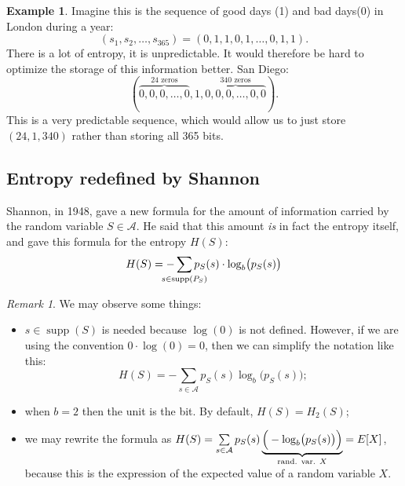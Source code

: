 \documentclass{report}
\DeclareMathOperator{\supp}{supp}
\theoremstyle{plain}
\theoremstyle{definition}
\newtheorem{exmp}[thm]{Example}
\theoremstyle{remark}
\newtheorem*{remark}{Remark}
\begin{document}
\begin{exmp} Imagine this is the sequence of good days (1) and bad days(0) in London during a year:
\begin{equation*}
	(s_1, s_2, \dots, s_{365}) = (0, 1, 1, 0, 1, \dots, 0, 1, 1).
\end{equation*}
 There is a lot of entropy, it is unpredictable. It would therefore be hard to optimize the storage of this information better.
San Diego:
\begin{equation*}
	(\overbrace{0, 0, 0, \dots, 0}^{\text{24 zeros}}, 1, \overbrace{0, 0, 0, \dots, 0, 0}^{\text{340 zeros}}).
\end{equation*}
 This is a very predictable sequence, which would allow us to just store $(24, 1, 340)$ rather than storing all 365 bits.
\end{exmp}

\subsection{Entropy redefined by Shannon}
Shannon, in 1948, gave a new formula for the amount of information carried by the random variable $S \in \mathcal A$. He said that this amount \emph{is} in fact the entropy itself, and gave this formula for the entropy $H(S)$:
\begin{equation}
	H(S) = -\sum_{\mathclap{s \in \supp (P_S)}} p_S(s) \cdot \log_b \bigl( p_S(s) \bigr)
\end{equation}

\begin{remark} We may observe some things:
	\begin{itemize}
		\item $s \in \supp (S)$ is needed because $\log(0)$ is not defined. However, if we are using the convention $0 \cdot \log(0) = 0$, then we can simplify the notation like this: \begin{equation*}H(S) = - \sum_{s \in \mathcal A} p_S(s) \log_b \bigl(p_S(s)\bigr); \end{equation*}
		\item when $b=2$ then the unit is the bit. By default, $H(S) = H_2(S)$;
		\item we may rewrite the formula as $H(S) = \sum\limits_{s \in \mathcal A} p_S(s) \underbrace{\Bigr(-\log_b \bigl(p_S(s)\bigl) \Bigl)}_{\text{rand. var. $X$}} = E[X]$, because this is the expression of the expected value of a random variable $X$.
	\end{itemize}
\end{remark}
\end{document}
